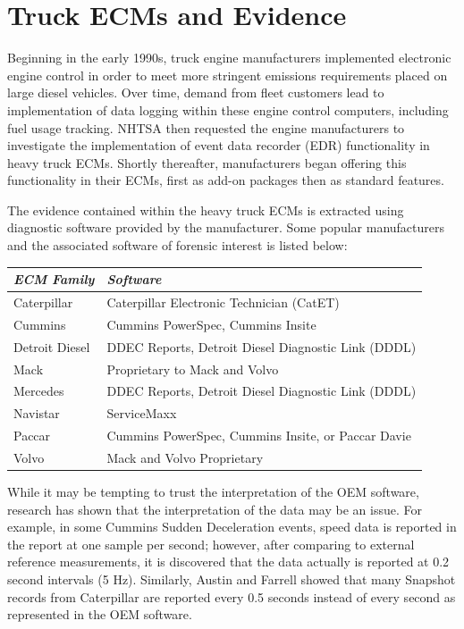 \documentclass{report}
\begin{document}
\section{Truck ECMs and Evidence}

Beginning in the early 1990s, truck engine manufacturers implemented electronic engine control in order to meet more stringent emissions
requirements placed on large diesel vehicles. Over time, demand from fleet customers lead to implementation of data logging within these
engine control computers, including fuel usage tracking. NHTSA then requested the engine manufacturers to investigate the implementation
of event data recorder (EDR) functionality in heavy truck ECMs. Shortly thereafter, manufacturers began offering this functionality in their
ECMs, first as add-on packages then as standard features.

The evidence contained within the heavy truck ECMs is extracted using diagnostic software provided by the manufacturer. Some popular
manufacturers and the associated software of forensic interest is listed below:

\begin{tabular}{|l|l|}
\hline
\emph{ECM Family} & \emph{Software}\\
\hline
Caterpillar & Caterpillar Electronic Technician (CatET)\\
\hline
Cummins & Cummins PowerSpec, Cummins Insite\\
\hline
Detroit Diesel & DDEC Reports, Detroit Diesel Diagnostic Link (DDDL)\\
\hline
Mack & Proprietary to Mack and Volvo\\
\hline
Mercedes & DDEC Reports, Detroit Diesel Diagnostic Link (DDDL)\\
\hline
Navistar & ServiceMaxx \\
\hline
Paccar & Cummins PowerSpec, Cummins Insite, or Paccar Davie\\
\hline
Volvo & Mack and Volvo Proprietary\\
\hline

\end{tabular}

While it may be tempting to trust the interpretation of the OEM software, research has shown 
that the interpretation of the data may be an issue. For example, in some Cummins Sudden Deceleration 
events, speed data is reported in the report at one sample per second; however, after comparing to 
external reference measurements, it is discovered that the data actually is reported at 0.2 second 
intervals (5 Hz)\cite{bortolin2009}. Similarly, Austin and Farrell \cite{austin2011} showed that many Snapshot records 
from Caterpillar are reported every 0.5 seconds instead of every second as represented in the OEM software.
\end{document}
